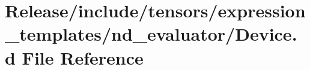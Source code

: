 \hypertarget{Release_2include_2tensors_2expression__templates_2nd__evaluator_2Device_8d}{}\section{Release/include/tensors/expression\+\_\+templates/nd\+\_\+evaluator/\+Device.d File Reference}
\label{Release_2include_2tensors_2expression__templates_2nd__evaluator_2Device_8d}
